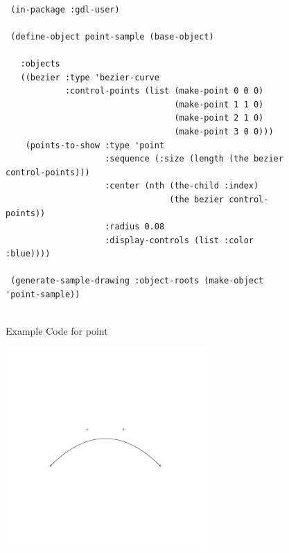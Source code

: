 \documentclass [11pt]{book}
\begin{document}
\begin{itemize}
\begin{description}
\end{description}




\begin{figure}
\begin{lrbox}{\boxedverb}
\begin{minipage}{\linewidth}
{\small

\begin{verbatim}

 (in-package :gdl-user)

 (define-object point-sample (base-object)
   
   :objects
   ((bezier :type 'bezier-curve
            :control-points (list (make-point 0 0 0)
                                  (make-point 1 1 0)
                                  (make-point 2 1 0)
                                  (make-point 3 0 0)))
    (points-to-show :type 'point
                    :sequence (:size (length (the bezier control-points)))
                    :center (nth (the-child :index) 
                                 (the bezier control-points))
                    :radius 0.08
                    :display-controls (list :color :blue))))

 (generate-sample-drawing :object-roots (make-object 'point-sample))


\end{verbatim}}
\end{minipage}
\end{lrbox}
\fbox{\usebox{\boxedverb}}

\caption{Example Code for point}

\label{fig:example-code-point}

\end{figure}

\begin{figure}
\begin{center}
\includegraphics[width=3in,height=3in]{../images/example-point.pdf}
\end{center}


\end{figure}
\end{itemize}
\end{document}
